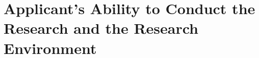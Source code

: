 
\section{Applicant's Ability to Conduct the Research and the Research Environment}
\vspace*{-0.5cm}


\PapersInstructions	%

